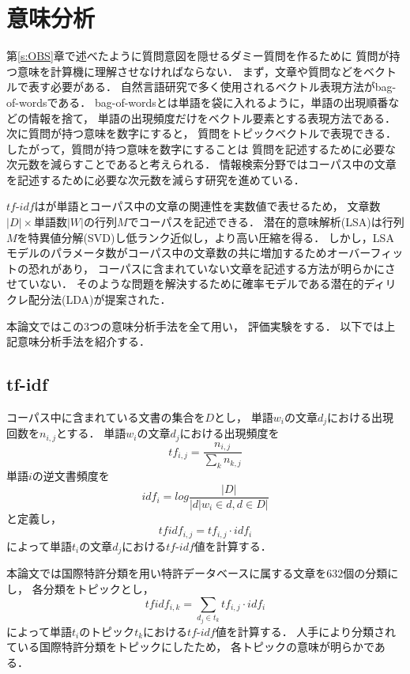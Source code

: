 \documentclass[master]{suribt}
\theoremstyle{definition}
\begin{document}
 \chapter{意味分析} \label{s:sm}
 第\ref{s:OBS}章で述べたように質問意図を隠せるダミー質問を作るために
 質問が持つ意味を計算機に理解させなければならない．
 まず，文章や質問などをベクトルで表す必要がある．
 自然言語研究で多く使用されるベクトル表現方法がbag-of-wordsである．
 bag-of-wordsとは単語を袋に入れるように，単語の出現順番などの情報を捨て，
 単語の出現頻度だけをベクトル要素とする表現方法である．
 次に質問が持つ意味を数字にすると，
 質問をトピックベクトルで表現できる．
 したがって，質問が持つ意味を数字にすることは
 質問を記述するために必要な次元数を減らすことであると考えられる．
 情報検索分野ではコーパス中の文章を記述するために必要な次元数を減らす研究を進めている．

 $tf\text{-}idf$はが単語とコーパス中の文章の関連性を実数値で表せるため，
 文章数$|D| \times$単語数$|W|$の行列$M$でコーパスを記述できる．
 潜在的意味解析(LSA)は行列$M$を特異値分解(SVD)し低ランク近似し，より高い圧縮を得る．
 しかし，LSAモデルのパラメータ数がコーパス中の文章数の共に増加するためオーバーフィットの恐れがあり，
 コーパスに含まれていない文章を記述する方法が明らかにさせていない．
 そのような問題を解決するために確率モデルである潜在的ディリクレ配分法(LDA)が提案された．

 本論文ではこの3つの意味分析手法を全て用い，
 評価実験をする．
 以下では上記意味分析手法を紹介する．

 \section{tf-idf}
 コーパス中に含まれている文書の集合を$D$とし，
 単語$w_i$の文章$d_j$における出現回数を$n_{i,j}$とする．
 単語$w_i$の文章$d_j$における出現頻度を
 \begin{equation}
 tf_{i,j} = \frac{n_{i,j}}{\sum_k n_{k,j}}
 \end{equation}
 単語$i$の逆文書頻度を
 \begin{equation}
 idf_i = log \frac{|D|}{|d|w_i \in d, d \in D|}
 \end{equation}
 と定義し，
 \begin{equation}
 tfidf_{i,j} = tf_{i,j} \cdot idf_i
 \end{equation}
 によって単語$t_i$の文章$d_j$における$tf\text{-}idf$値を計算する．
 
 本論文では国際特許分類を用い特許データベースに属する文章を$632$個の分類にし，
 各分類をトピックとし，
 \begin{equation}
 tfidf_{i,k} = \sum_{d_j \in t_k}tf_{i,j} \cdot idf_i
 \end{equation}
 によって単語$t_i$のトピック$t_k$における$tf\text{-}idf$値を計算する．
 人手により分類されている国際特許分類をトピックにしたため，
 各トピックの意味が明らかである．
\end{document}
